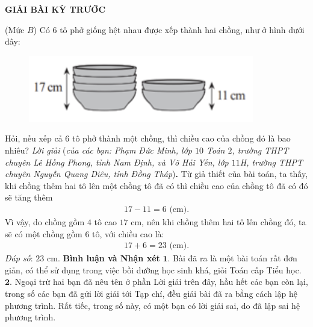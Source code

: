 \centerline{{\large{\textbf{\color{thachthuctoanhoc}\color{thachthuctoanhoc}\color{thachthuctoanhoc}GIẢI BÀI KỲ TRƯỚC}}}}
\vspace*{-5pt}
\begin{multicols}{2}
	\setlength{\abovedisplayskip}{5pt}
	\setlength{\belowdisplayskip}{5pt}
	{}
	(Mức $B$) Có $6$ tô phở giống hệt nhau được xếp thành hai chồng, như ở hình dưới đây: 
	\begin{figure}[H]
		\vspace*{-10pt}
		\centering
		\captionsetup{labelformat= empty, justification=centering}
		\includegraphics[width= 0.9\linewidth]{1}
		\vspace*{-5pt}
	\end{figure}
	Hỏi, nếu xếp cả $6$ tô phở thành một chồng, thì chiều cao của chồng đó là bao nhiêu?
	\vskip 0.05cm
	\textit{Lời giải} (\textit{của các bạn: Phạm Đức Minh, lớp $10$ Toán $2$, trường THPT chuyên Lê Hồng Phong, tỉnh Nam Định, và Võ Hải Yến, lớp $11$H, trường THPT chuyên Nguyễn Quang Diêu, tỉnh Đồng Tháp})\textbf{.}
	\vskip 0.05cm
	Từ giả thiết của bài toán, ta thấy, khi chồng thêm hai tô lên một chồng tô đã có thì chiều cao của chồng tô đã có đó sẽ tăng thêm
	\begin{align*}
		17 - 11 = 6 \text{ (cm)}.
	\end{align*}
	Vì vậy, do chồng gồm $4$ tô cao $17$ cm, nên khi chồng thêm hai tô lên chồng đó, ta sẽ có một chồng gồm $6$ tô, với chiều cao là:
	\begin{align*}
		17 + 6 = 23 \text{ (cm)}.
	\end{align*}
	\textit{Đáp số}: $23$ cm.
	\vskip 0.1cm
	\textbf{\color{thachthuctoanhoc}Bình luận và Nhận xét}
	\vskip 0.05cm	
	$\pmb{1.}$ Bài đã ra là một bài toán rất đơn giản, có thể sử dụng trong việc bồi dưỡng học sinh khá, giỏi Toán cấp Tiểu học.
	\vskip 0.05cm
	$\pmb{2.}$ Ngoại trừ hai bạn đã nêu tên ở phần Lời giải trên đây, hầu hết các bạn còn lại, trong số các bạn đã gửi lời giải tới Tạp chí, đều giải bài đã ra bằng cách lập hệ phương trình. Rất tiếc, trong số này, có một bạn có lời giải sai, do đã lập sai hệ phương trình.
	\begin{flushright}

\end{flushright}
\end{multicols}
